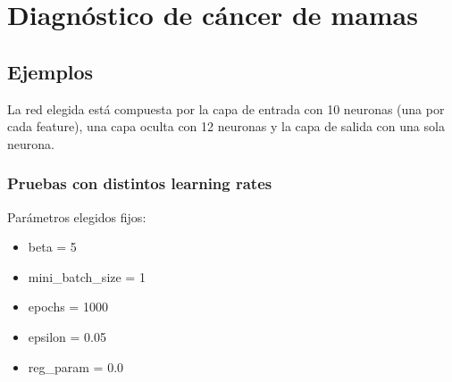 \section{Diagnóstico de cáncer de mamas}

\subsection{Ejemplos}

La red elegida está compuesta por la capa de entrada con 10 neuronas (una por cada feature), una capa oculta con 12 neuronas y la capa de salida con una sola neurona. 

\subsubsection{Pruebas con distintos learning rates}

Parámetros elegidos fijos:

\begin{itemize}
\item beta = 5
\item mini\_batch\_size = 1
\item epochs = 1000
\item epsilon = 0.05
\item reg\_param = 0.0
\end{itemize}


